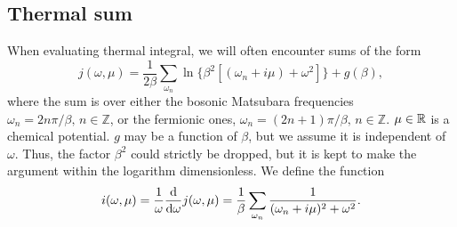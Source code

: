 \subsection{Thermal sum}
\label{section: thermal sum}

When evaluating thermal integral, we will often encounter sums of the form
\begin{equation}
    \label{j func}
    j(\omega, \mu) = \frac{1}{2\beta} \sum_{\omega_n} 
    \ln\{\beta^2 [(\omega_n + i \mu) + \omega^2] \} + g(\beta),
\end{equation}
where the sum is over either the bosonic Matsubara frequencies $\omega_n = 2n \pi / \beta,\, n \in \mathbb{Z}$, or the fermionic ones, $\omega_n = (2n + 1) \pi /\beta ,\, n \in \mathbb{Z}$.
$\mu \in \mathbb{R}$ is a chemical potential.
$g$ may be a function of $\beta$, but we assume it is independent of $\omega$.
Thus, the factor $\beta^2$ could strictly be dropped, but it is kept to make the argument within the logarithm dimensionless.
We define the function
\begin{equation}
    \label{i func}
    i(\omega, \mu) = \frac{1}{\omega} \dv{\omega} j(\omega, \mu) 
    = \frac{1}{\beta} \sum_{\omega_n} \frac{1}{(\omega_n + i\mu)^2 + \omega^2}. 
\end{equation}

